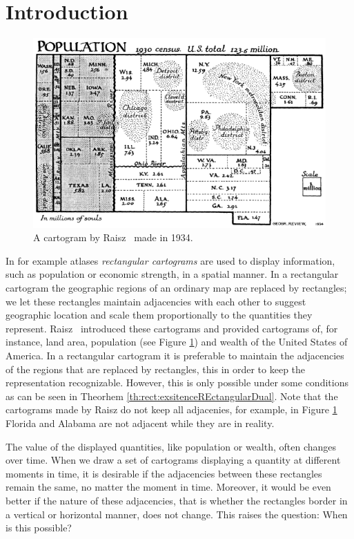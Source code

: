 
\section{Introduction}
\thispagestyle{plain}


  \begin{figure}[!t]
    \centering
    \includegraphics[scale=.5]{introduction/img/cartogram.png}
    \caption{A cartogram by Raisz~\cite{Raisz1934} made in 1934.}
    \label{fig:intro:raisz}
  \end{figure}
  In for example atlases \emph{rectangular cartograms} are used to display information, such as population or economic strength, in a spatial manner.
  In a rectangular cartogram  the geographic regions of an ordinary map are replaced by rectangles; we let these rectangles maintain adjacencies with each other to suggest geographic location and scale them proportionally to the quantities they represent.
  Raisz~\cite{Raisz1934} introduced these cartograms and provided cartograms of, for instance, land area, population (see Figure  \ref{fig:intro:raisz}) and wealth of the United States of America.
  In a rectangular cartogram it is preferable to maintain the adjacencies of the regions that are replaced by rectangles, this in order to keep the representation recognizable.
  However, this is only possible under some conditions as can be seen in Theorhem \ref{th:rect:exsitenceREctangularDual}.
  Note that the cartograms made by Raisz do not keep all adjacenies, for example, in Figure \ref{fig:intro:raisz} Florida and Alabama are not adjacent while they are in reality.

  The value of the displayed quantities, like population or wealth, often changes over time.
  When we draw a set of cartograms displaying a quantity at different moments in time, it is desirable if the adjacencies between these rectangles remain the same, no matter the moment in time.
  Moreover, it would be even better if the nature of these adjacencies, that is whether the rectangles border in a vertical or horizontal manner, does not change.
  This raises the question: When is this possible?


